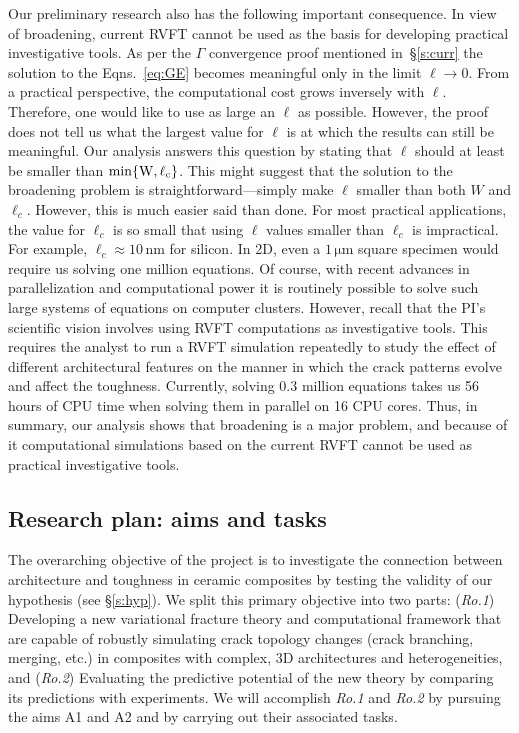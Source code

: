 \documentclass[10pt,letterpaper]{article}
\newcommand{\unit}[1]{\ensuremath{\, \mathrm{#1}}}
\begin{document}
    Our preliminary research also has the following important consequence.
    In view of broadening, current RVFT cannot be used as the basis for developing practical investigative tools.
    As per the $\mathit{\Gamma}$ convergence proof mentioned in~\S\ref{s:curr} the solution to the Eqns.~\eqref{eq:GE} becomes meaningful only in the limit $\ell\to 0$.
    From a practical perspective, the computational cost grows inversely with $\ell$.
    Therefore, one would like to use as large an $\ell$ as possible.
    However, the proof does not tell us what the largest value for $\ell$ is at which the results can still be meaningful.
    Our analysis answers this question by stating that $\ell$ should at least be smaller than $\rm{min}\{W, \ell_c\}$.
    This might suggest that the solution to the broadening problem is straightforward---simply make $\ell$ smaller than both $W$ and $\ell_c$.
    However, this is much easier said than done.
    For most practical applications, the value for $\ell_c$ is so small that using $\ell$ values smaller than $\ell_c$ is impractical.
    For example, $\ell_c\approx 10\unit{nm}$ for silicon.
    In 2D, even a $1\unit{\mu m}$ square specimen would require us solving one million equations.  Of course, with recent advances in parallelization and computational power it is routinely possible to solve such large systems of equations on computer clusters.
    However, recall that the PI's scientific vision involves using RVFT computations as investigative tools.
    This requires the analyst to run a RVFT simulation repeatedly to study the effect of different architectural features on the manner in which the crack patterns evolve and affect the toughness.
    Currently, solving 0.3 million equations takes us 56 hours of CPU time when solving them in parallel on 16 CPU cores.
    Thus, in summary, our analysis shows that broadening is a major problem, and because of it computational simulations based on the current RVFT cannot be used as practical investigative tools.

  \subsection{Research plan: aims and tasks}
    \label{s:aims}
    The overarching objective of the project is to investigate the connection between architecture and toughness in ceramic composites by testing the validity of our hypothesis (see \S \ref{s:hyp}). We split this primary objective into two parts: (\emph{Ro.1}) Developing a new variational fracture theory and computational framework that are capable of robustly simulating crack topology changes (crack branching, merging, etc.) in composites with complex, 3D architectures and heterogeneities, and (\emph{Ro.2}) Evaluating the predictive potential of the new theory by comparing its predictions with experiments. We will accomplish \emph{Ro.1} and \emph{Ro.2} by pursuing the aims A1 and A2 and by carrying out their associated tasks.
\end{document}
